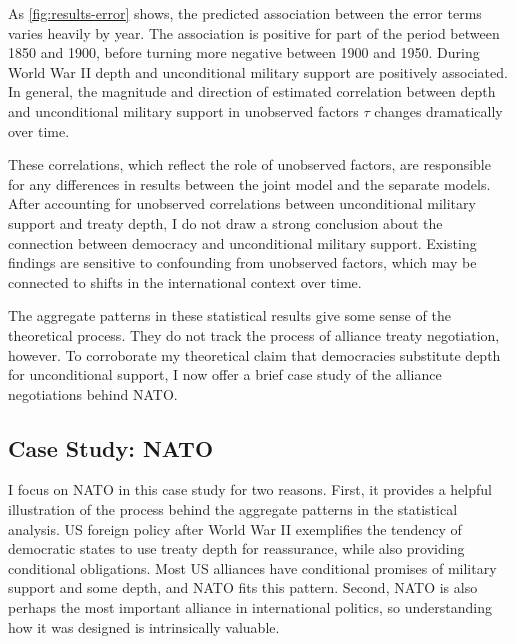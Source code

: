 \documentclass[12pt]{article}
\begin{document}
As \autoref{fig:results-error} shows, the predicted association between the error terms varies heavily by year. 
The association is positive for part of the period between 1850 and 1900, before turning more negative between 1900 and 1950. 
During World War II depth and unconditional military support are positively associated. 
In general, the magnitude and direction of estimated correlation between depth and unconditional military support in unobserved factors $\tau$ changes dramatically over time.  


These correlations, which reflect the role of unobserved factors, are responsible for any differences in results between the joint model and the separate models. 
After accounting for unobserved correlations between unconditional military support and treaty depth, I do not draw a strong conclusion about the connection between democracy and unconditional military support. 
Existing findings are sensitive to confounding from unobserved factors, which may be connected to shifts in the international context over time. 
 

The aggregate patterns in these statistical results give some sense of the theoretical process. 
They do not track the process of alliance treaty negotiation, however. 
To corroborate my theoretical claim that democracies substitute depth for unconditional support, I now offer a brief case study of the alliance negotiations behind NATO. 


\subsection{Case Study: NATO}


I focus on NATO in this case study for two reasons. 
First, it provides a helpful illustration of the process behind the aggregate patterns in the statistical analysis. 
US foreign policy after World War II exemplifies the tendency of democratic states to use treaty depth for reassurance, while also providing conditional obligations.  
Most US alliances have conditional promises of military support and some depth, and NATO fits this pattern.
Second, NATO is also perhaps the most important alliance in international politics, so understanding how it was designed is intrinsically valuable. 
\end{document}
